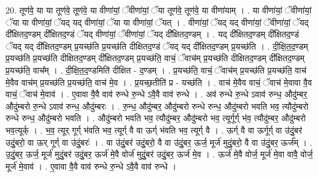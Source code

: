 \documentclass[17pt]{extarticle}
\begin{document}
20. तूण॑वे॒ या या तूण॑वे॒ तूण॑वे॒ या वीणा॑यां॒ ॅवीणा॑यां॒ ॅया तूण॑वे॒ तूण॑वे॒ या वीणा॑याम् । . या वीणा॑यां॒ ॅवीणा॑यां॒ ॅया या वीणा॑यां॒ ॅयद् यद् वीणा॑यां॒ ॅया या वीणा॑यां॒ ॅयत् । . वीणा॑यां॒ ॅयद् यद् वीणा॑यां॒ ॅवीणा॑यां॒ ॅयद् दी᳚क्षितद॒ण्डम् दी᳚क्षितद॒ण्डं ॅयद् वीणा॑यां॒ ॅवीणा॑यां॒ ॅयद् दी᳚क्षितद॒ण्डम् । . यद् दी᳚क्षितद॒ण्डम् दी᳚क्षितद॒ण्डं ॅयद् यद् दी᳚क्षितद॒ण्डम् प्र॒यच्छ॑ति प्र॒यच्छ॑ति दीक्षितद॒ण्डं ॅयद् यद् दी᳚क्षितद॒ण्डम् प्र॒यच्छ॑ति । . दी॒क्षि॒त॒द॒ण्डम् प्र॒यच्छ॑ति प्र॒यच्छ॑ति दीक्षितद॒ण्डम् दी᳚क्षितद॒ण्डम् प्र॒यच्छ॑ति॒ वाचं॒ ॅवाच॑म् प्र॒यच्छ॑ति दीक्षितद॒ण्डम् दी᳚क्षितद॒ण्डम् प्र॒यच्छ॑ति॒ वाच᳚म् । . दी॒क्षि॒त॒द॒ण्डमिति॑ दीक्षित - द॒ण्डम् । . प्र॒यच्छ॑ति॒ वाचं॒ ॅवाच॑म् प्र॒यच्छ॑ति प्र॒यच्छ॑ति॒ वाच॑ मे॒वैव वाच॑म् प्र॒यच्छ॑ति प्र॒यच्छ॑ति॒ वाच॑ मे॒व । . प्र॒यच्छ॒तीति॑ प्र - यच्छ॑ति । . वाच॑ मे॒वैव वाचं॒ ॅवाच॑ मे॒वावा वै॒व वाचं॒ ॅवाच॑ मे॒वाव॑ । . ए॒वावा वै॒वै वाव॑ रुन्धे रु॒न्धे ऽवै॒वै वाव॑ रुन्धे । . अव॑ रुन्धे रु॒न्धे ऽवाव॑ रुन्ध॒ औदु॑म्बर॒ औदु॑म्बरो रु॒न्धे ऽवाव॑ रुन्ध॒ औदु॑म्बरः । . रु॒न्ध॒ औदु॑म्बर॒ औदु॑म्बरो रुन्धे रुन्ध॒ औदु॑म्बरो भवति भव॒ त्यौदु॑म्बरो रुन्धे रुन्ध॒ औदु॑म्बरो भवति । . औदु॑म्बरो भवति भव॒ त्यौदु॑म्बर॒ औदु॑म्बरो भव॒ त्यूर्गूर्ग् भ॑व॒ त्यौदु॑म्बर॒ औदु॑म्बरो भव॒त्यूर्क् । . भ॒व॒ त्यूर् गूर्ग् भ॑वति भव॒ त्यूर्ग् वै वा ऊर्ग् भ॑वति भव॒ त्यूर्ग् वै । . ऊर्ग् वै वा ऊर्गूर्ग् वा उ॑दुं॒बर॑ उदुं॒बरो॒ वा ऊर् गूर्ग् वा उ॑दुं॒बरः॑ । . वा उ॑दुं॒बर॑ उदुं॒बरो॒ वै वा उ॑दुं॒बर॒ ऊर्ज॒ मूर्ज॑ मुदुं॒बरो॒ वै वा उ॑दुं॒बर॒ ऊर्ज᳚म् । . उ॒दुं॒बर॒ ऊर्ज॒ मूर्ज॑ मुदुं॒बर॑ उदुं॒बर॒ ऊर्ज॑ मे॒वै वोर्ज॑ मुदुं॒बर॑ उदुं॒बर॒ ऊर्ज॑ मे॒व । . ऊर्ज॑ मे॒वै वोर्ज॒ मूर्ज॑ मे॒वा वावै॒ वोर्ज॒ मूर्ज॑ मे॒वाव॑ । . ए॒वावा वै॒वै वाव॑ रुन्धे रु॒न्धे ऽवै॒वै वाव॑ रुन्धे । \newline
\end{document}
